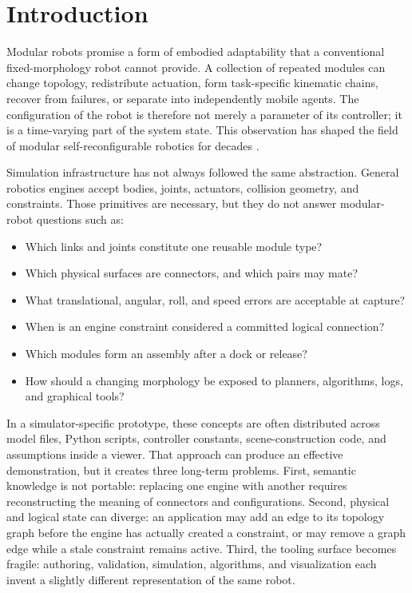 \section{Introduction}
\label{sec:introduction}

Modular robots promise a form of embodied adaptability that a conventional
fixed-morphology robot cannot provide. A collection of repeated modules can change
topology, redistribute actuation, form task-specific kinematic chains, recover from
failures, or separate into independently mobile agents. The configuration of the
robot is therefore not merely a parameter of its controller; it is a time-varying
part of the system state. This observation has shaped the field of modular
self-reconfigurable robotics for decades \citep{yim2007modular}.

Simulation infrastructure has not always followed the same abstraction. General
robotics engines accept bodies, joints, actuators, collision geometry, and constraints.
Those primitives are necessary, but they do not answer modular-robot questions such
as:

\begin{itemize}
  \item Which links and joints constitute one reusable module type?
  \item Which physical surfaces are connectors, and which pairs may mate?
  \item What translational, angular, roll, and speed errors are acceptable at capture?
  \item When is an engine constraint considered a committed logical connection?
  \item Which modules form an assembly after a dock or release?
  \item How should a changing morphology be exposed to planners, algorithms, logs, and
        graphical tools?
\end{itemize}

In a simulator-specific prototype, these concepts are often distributed across model
files, Python scripts, controller constants, scene-construction code, and assumptions
inside a viewer. That approach can produce an effective demonstration, but it creates
three long-term problems. First, semantic knowledge is not portable: replacing one
engine with another requires reconstructing the meaning of connectors and
configurations. Second, physical and logical state can diverge: an application may add
an edge to its topology graph before the engine has actually created a constraint, or
may remove a graph edge while a stale constraint remains active. Third, the tooling
surface becomes fragile: authoring, validation, simulation, algorithms, and
visualization each invent a slightly different representation of the same robot.

